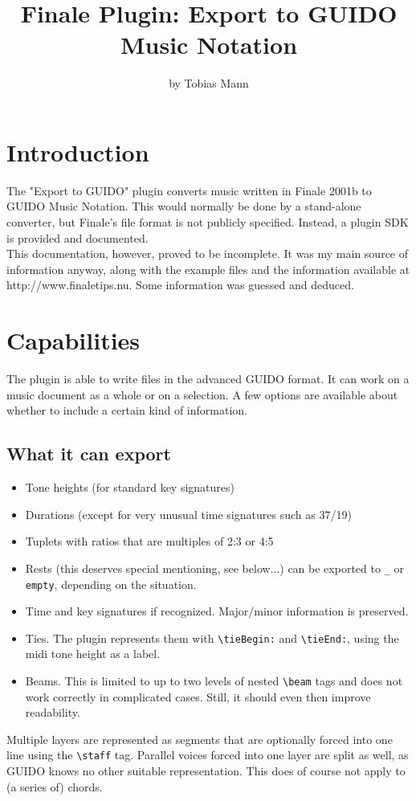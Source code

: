 \documentclass{article}
\begin{document}
\title{Finale Plugin: Export to GUIDO Music Notation}
\author{by Tobias Mann}
\maketitle
\section{Introduction}
The "Export to GUIDO" plugin converts music written in Finale 2001b to
GUIDO Music Notation. This would normally be done by a stand-alone converter, but
Finale's file format is not publicly specified. Instead, a plugin SDK is provided
and documented.\\
This documentation, however, proved to be incomplete. It was my main source
of information anyway, along with the example files and the information
available at http://www.finaletips.nu. Some information was guessed and
deduced.

\section{Capabilities}
The plugin is able to write files in the advanced GUIDO format. It can work on
a music document as a whole or on a selection. A few options
are available about whether to include a certain kind of information.
\subsection{What it can export}
\begin{itemize}
\item Tone heights (for standard key signatures)
\item Durations (except for very unusual time signatures such as 37/19)
\item Tuplets with ratios that are multiples of 2:3 or 4:5
\item Rests (this deserves special mentioning, see below...) can be exported to
\verb"_" or \verb"empty", depending on the situation. 
\item Time and key signatures if recognized. Major/minor information is preserved.
\item Ties. The plugin represents them with \verb"\tieBegin:" and \verb"\tieEnd:", using
the midi tone height as a label.
\item Beams. This is limited to up to two levels of nested \verb"\beam" tags and does not
work correctly in complicated cases. Still, it should even then improve readability. 
\end{itemize}
Multiple layers are represented as segments that are optionally forced into one
line using the \verb"\staff" tag. Parallel voices forced into one layer are
split as well, as GUIDO knows no other suitable representation. This does of
course not apply to (a series of) chords.
\end{document}
